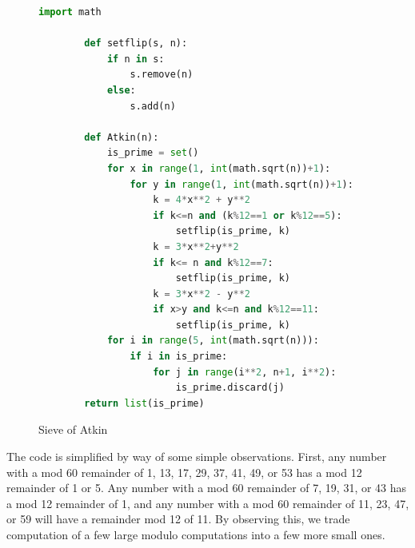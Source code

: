 \documentclass{amsart}
\theoremstyle{definition}
\theoremstyle{case}
\begin{document}
	\begin{figure}[H]\caption{Sieve of Atkin}
		\begin{lstlisting}[language=Python]
        import math
        
        def setflip(s, n):
            if n in s:
                s.remove(n)
            else:
                s.add(n)
        
		def Atkin(n):
            is_prime = set()
            for x in range(1, int(math.sqrt(n))+1):
                for y in range(1, int(math.sqrt(n))+1):
                    k = 4*x**2 + y**2
                    if k<=n and (k%12==1 or k%12==5):
                        setflip(is_prime, k)
                    k = 3*x**2+y**2
                    if k<= n and k%12==7:
                        setflip(is_prime, k)
                    k = 3*x**2 - y**2
                    if x>y and k<=n and k%12==11:
                        setflip(is_prime, k)
            for i in range(5, int(math.sqrt(n))):
                if i in is_prime:
                    for j in range(i**2, n+1, i**2):
                        is_prime.discard(j)
        return list(is_prime)
		\end{lstlisting}
	\end{figure}
	
	The code is simplified by way of some simple observations. First, any number with a mod 60 remainder of 1, 13, 17, 29, 37, 41, 49, or 53 has a mod 12 remainder of 1 or 5. Any number with a mod 60 remainder of 7, 19, 31, or 43 has a mod 12 remainder of 1, and any number with a mod 60 remainder of 11, 23, 47, or 59 will have a remainder mod 12 of 11. By observing this, we trade computation of a few large modulo computations into a few more small ones.
	
\end{document}
